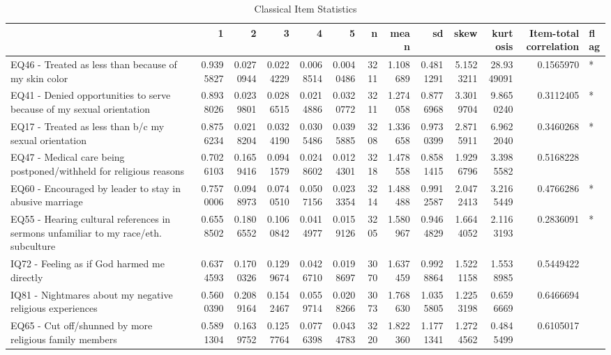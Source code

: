\documentclass[
  letterpaper,
]{article}
\begin{document}
\hypertarget{tbl-ClassicalItemTable}{}
\begin{table}
\caption{\label{tbl-ClassicalItemTable}Classical Item Statistics }\tabularnewline

\centering
\begin{tabular}{l|r|r|r|r|r|r|r|r|r|r|r|l}
\hline
  & 1 & 2 & 3 & 4 & 5 & n & mean & sd & skew & kurtosis & Item-total correlation & flag\\
\hline
EQ46 - Treated as less than because of my skin color & 0.9395827 & 0.0270944 & 0.0224229 & 0.0068514 & 0.0040486 & 3211 & 1.108689 & 0.4811291 & 5.1523211 & 28.9349091 & 0.1565970 & *\\
\hline
EQ41 - Denied opportunities to serve because of my sexual orientation & 0.8938026 & 0.0239801 & 0.0286515 & 0.0214886 & 0.0320772 & 3211 & 1.274058 & 0.8776968 & 3.3019704 & 9.8650240 & 0.3112405 & *\\
\hline
EQ17 - Treated as less than b/c my sexual orientation & 0.8756234 & 0.0218204 & 0.0324190 & 0.0305486 & 0.0395885 & 3208 & 1.336658 & 0.9730399 & 2.8715911 & 6.9622040 & 0.3460268 & *\\
\hline
EQ47 - Medical care being postponed/withheld for religious reasons & 0.7026103 & 0.1659416 & 0.0941579 & 0.0248602 & 0.0124301 & 3218 & 1.478558 & 0.8581415 & 1.9296796 & 3.3985582 & 0.5168228 & \\
\hline
EQ60 - Encouraged by leader to stay in abusive marriage & 0.7570006 & 0.0948973 & 0.0740510 & 0.0507156 & 0.0233354 & 3214 & 1.488488 & 0.9912587 & 2.0472413 & 3.2165449 & 0.4766286 & *\\
\hline
EQ55 - Hearing cultural references in sermons unfamiliar to my race/eth. subculture & 0.6558502 & 0.1806552 & 0.1060842 & 0.0414977 & 0.0159126 & 3205 & 1.580967 & 0.9464829 & 1.6644052 & 2.1163193 & 0.2836091 & *\\
\hline
IQ72 - Feeling as if God harmed me directly & 0.6374593 & 0.1700326 & 0.1299674 & 0.0426710 & 0.0198697 & 3070 & 1.637459 & 0.9928864 & 1.5221158 & 1.5538985 & 0.5449422 & \\
\hline
IQ81 - Nightmares about my negative religious experiences & 0.5600390 & 0.2089164 & 0.1542467 & 0.0559714 & 0.0208266 & 3073 & 1.768630 & 1.0355805 & 1.2253198 & 0.6596669 & 0.6466694 & \\
\hline
EQ65 - Cut off/shunned by more religious family members & 0.5891304 & 0.1639752 & 0.1257764 & 0.0776398 & 0.0434783 & 3220 & 1.822360 & 1.1771341 & 1.2724562 & 0.4845499 & 0.6105017 & \\
\hline

\end{tabular}
\end{table}
\end{document}

